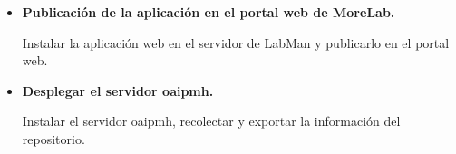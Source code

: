 \begin{itemize}
	\item \textbf{Publicación de la aplicación en el portal web de MoreLab.}
	
	Instalar la aplicación web en el servidor de LabMan y publicarlo en el portal web.
	\item \textbf{Desplegar el servidor \acrshort{oaipmh}.}

	Instalar el servidor \acrshort{oaipmh}, recolectar y exportar la información del repositorio.
\end{itemize}
